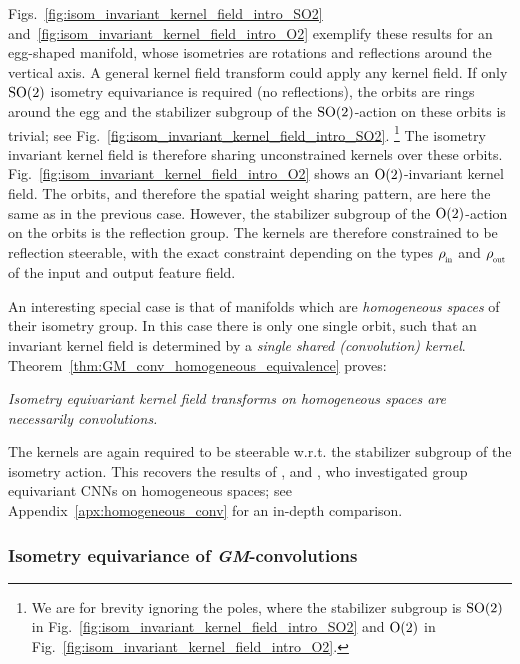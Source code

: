 Figs.~\ref{fig:isom_invariant_kernel_field_intro_SO2} and~\ref{fig:isom_invariant_kernel_field_intro_O2}
exemplify these results for an egg-shaped manifold, whose isometries are rotations and reflections around the vertical axis.
A general kernel field transform could apply any kernel field.
If only $\operatorname{SO}(2)$ isometry equivariance is required (no reflections), the orbits are rings around the egg and the stabilizer subgroup of the $\operatorname{SO}(2)$-action on these orbits is trivial; see Fig.~\ref{fig:isom_invariant_kernel_field_intro_SO2}.%
\footnote{
    We are for brevity ignoring the poles, where the stabilizer subgroup is $\operatorname{SO}(2)$ in Fig.~\ref{fig:isom_invariant_kernel_field_intro_SO2} and $\operatorname{O}(2)$ in Fig.~\ref{fig:isom_invariant_kernel_field_intro_O2}.
}
The isometry invariant kernel field is therefore sharing unconstrained kernels over these orbits.
Fig.~\ref{fig:isom_invariant_kernel_field_intro_O2} shows an $\operatorname{O}(2)$-invariant kernel field.
The orbits, and therefore the spatial weight sharing pattern, are here the same as in the previous case.
However, the stabilizer subgroup of the $\operatorname{O}(2)$-action on the orbits is the reflection group.
The kernels are therefore constrained to be reflection steerable, with the exact constraint depending on the types $\rhoin$ and $\rhoout$ of the input and output feature field.


An interesting special case
is that of manifolds which are \emph{homogeneous spaces} of their isometry group.
In this case there is only one single orbit, such that an invariant kernel field is determined by a \emph{single shared (convolution) kernel}.
Theorem~\ref{thm:GM_conv_homogeneous_equivalence} proves:
\begin{center}\it
    Isometry equivariant kernel field transforms on homogeneous spaces are necessarily convolutions.
\end{center}
The kernels are again required to be steerable w.r.t. the stabilizer subgroup of the isometry action.
This recovers the results of \citet{Kondor2018-GENERAL}, \citet{Cohen2019-generaltheory} and \citet{bekkers2020bspline}, who investigated group equivariant CNNs on homogeneous spaces; see Appendix~\ref{apx:homogeneous_conv} for an in-depth comparison.








\subsubsection{Isometry equivariance of \textit{GM}-convolutions}
\label{sec:visual_intro_isom_equiv_conv}

